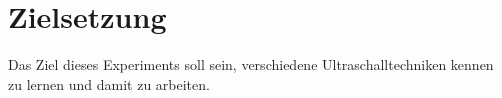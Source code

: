 \section{Zielsetzung}
\label{sec:Zielsetzung}

Das Ziel dieses Experiments soll sein, verschiedene Ultraschalltechniken kennen 
zu lernen und damit zu arbeiten.
